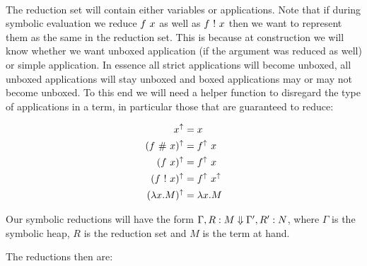 \documentclass[a4paper]{article}
\begin{document}
\mbox{}\\

The reduction set will contain either variables or applications. Note that if during symbolic evaluation we reduce $f \  x$ as well as $f \ !\  x$ then we want to represent them as the same in the reduction set. This is because at construction we will know whether we want unboxed application (if the argument was reduced as well) or simple application. In essence all strict applications will become unboxed, all unboxed applications will stay unboxed and boxed applications may or may not become unboxed. To this end we will need a helper function to disregard the type of applications in a term, in particular those that are guaranteed to reduce:

\newcommand{\uppity}[1]{#1^{\uparrow}}

\begin{align*}
  \uppity{x} &= x\\
  \uppity{(f \unboxed x)} &= \uppity{f} \app x\\
  \uppity{(f \app x)} &= \uppity{f} \app x\\
  \uppity{(f \strict x)} &= \uppity{f} \app \uppity{x}\\
  \uppity{(\lambda x. M)} &= \lambda x. M
\end{align*}


Our symbolic reductions will have the form $\Gamma, R : M \Downarrow \Gamma', R' : N$, where $\Gamma$ is the symbolic heap, $R$ is the reduction set and $M$ is the term at hand.

The reductions then are:
\end{document}
